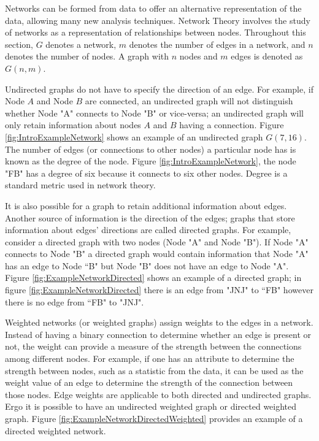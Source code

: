 Networks can be formed from data to offer an alternative representation of the data, allowing many new analysis techniques. Network Theory involves the study of networks as a representation of relationships between nodes. Throughout this section, \(G\) denotes a network, \(m\) denotes the number of edges in a network, and \(n\) denotes the number of nodes.  A graph with \(n\) nodes and \(m\) edges is denoted as \(G(n,m)\).

Undirected graphs do not have to specify the direction of an edge.  For example, if Node \(A\) and Node \(B\) are connected, an undirected graph will not distinguish whether Node "A" connects to Node "B" or vice-versa;  an undirected graph will only retain information about nodes \(A\) and \(B\) having a connection. Figure \ref{fig:IntroExampleNetwork} shows an example of an undirected graph \(G(7,16)\). The number of edges (or connections to other nodes) a particular node has is known as the degree of the node. Figure \ref{fig:IntroExampleNetwork}, the node "FB" has a degree of six because it connects to six other nodes. Degree is a standard metric used in network theory.

It is also possible for a graph to retain additional information about edges. Another source of information is the direction of the edges; graphs that store information about edges' directions are called directed graphs. For example, consider a directed graph with two nodes (Node "A" and Node "B"). If Node "A"  connects to Node "B" a directed graph would contain information that Node "A"  has an edge to Node ``B" but Node "B" does not have an edge to Node "A".  Figure \ref{fig:ExampleNetworkDirected} shows an example of a directed graph; in figure \ref{fig:ExampleNetworkDirected} there is an edge from "JNJ" to ``FB"  however there is no edge from ``FB" to "JNJ".

Weighted networks (or weighted graphs) assign weights to the edges in a network. Instead of having a binary connection to determine whether an edge is present or not, the weight can provide a measure of the strength between the connections among different nodes. For example, if one has an attribute to determine the strength between nodes, such as a statistic from the data,  it can be used as the weight value of an edge to determine the strength of the connection between those nodes.  Edge weights are applicable to both directed and undirected graphs. Ergo it is possible to have an undirected weighted graph or directed weighted graph. Figure \ref{fig:ExampleNetworkDirectedWeighted} provides an example of a directed weighted network. 

